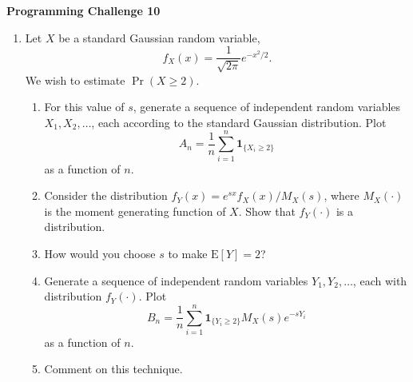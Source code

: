 \documentclass[11pt]{article}
\newif\ifsoln
\begin{document}
\begin{center}
{\bfseries \LARGE Programming Challenge 10}
\end{center}

\begin{enumerate}
\item Let $X$ be a standard Gaussian random variable,
\begin{equation*}
f_X (x) = \frac{1}{\sqrt{2 \pi}} e^{-x^2/2} .
\end{equation*}
We wish to estimate $\Pr (X \geq 2)$.
\begin{enumerate}
\item For this value of $s$, generate a sequence of independent random variables $X_1, X_2, \ldots$, each according to the standard Gaussian distribution.
Plot
\begin{equation*}
A_n = \frac{1}{n} \sum_{i=1}^n \mathbf{1}_{ \{ X_i \geq 2 \}}
\end{equation*}
as a function of $n$.
\item Consider the distribution $f_Y(x) = e^{sx} f_X(x) / M_X (s)$, where $M_X (\cdot)$ is the moment generating function of $X$.
Show that $f_Y(\cdot)$ is a distribution.
\item How would you choose $s$ to make $\mathrm{E}[Y] = 2$?

\ifsoln
First we note that
\begin{equation*}
\mathrm{E} [Y] = \mathrm{E}_X \left[ \frac{ x e^{sx} }{ M_X (s) } \right]
= \frac{1}{ M_X (s) } \mathrm{E}_X \left[ x e^{sx} \right]
= \frac{1}{ M_X (s) } \frac{d}{ds} M_X (s) .
\end{equation*}
For the standard Gaussian random variable, we have $M_X (s) = e^{-s^2/2}$ and $M_X' (s) = - s e^{-s^2/2}$.
Thus, we obtain $s = -2$.
\fi

\item Generate a sequence of independent random variables $Y_1, Y_2, \ldots$, each with distribution $f_Y (\cdot)$.
Plot
\begin{equation*}
B_n = \frac{1}{n} \sum_{i=1}^n \mathbf{1}_{ \{ Y_i \geq 2 \}} M_X (s) e^{-sY_i}
\end{equation*}
as a function of $n$.
\item Comment on this technique.
\end{enumerate}

\end{enumerate}
\end{document}

